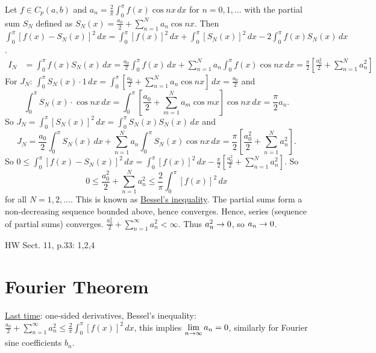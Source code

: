\documentclass[]{article}
\begin{document}
Let $f\in C_p(a,b)$ and $a_n=\frac{2}{\pi} \int_0^\pi f(x) \cos{nx} \, dx$ for $n=0,1,\dots$ with the partial sum $S_N$ defined as $S_N(x) = \frac{a_0}{2} + \sum_{n=1}^N a_n \cos{nx}$.
Then $\int_0^\pi \left[ f(x) - S_N(x) \right]^2 \, dx = \int_0^\pi \left[ f(x) \right]^2 \, dx + \int_0^\pi \left[ S_N(x) \right]^2 \, dx - 2\int_0^\pi f(x) S_N(x) \, dx$.
\begin{align*}I_N &= \int_0^\pi f(x) S_N(x) \, dx = \frac{a_0}{2} \int_0^\pi f(x) \, dx + \sum_{n=1}^N a_n \int_0^\pi f(x) \cos{nx} \, dx = \frac{\pi}{2} \left[ \frac{a_0^2}{2} + \sum_{n=1}^N a_n^2 \right] \end{align*}
For $J_N$: $\int_0^\pi S_N(x)\cdot1\,dx = \int_0^\pi \left[ \frac{a_0}{2} + \sum_{n=1}^N a_n \cos{nx} \right] \, dx = \frac{a_0}{2}$
and $$\int_0^\pi S_N(x) \cdot \cos{nx} \, dx = \int_0^\pi \left[ \frac{a_0}{2} + \sum_{m=1}^N a_m \cos{mx} \right] \cos{nx} \, dx = \frac{\pi}{2} a_n.$$
So $J_N = \int_0^\pi \left[ S_N(x) \right]^2 \, dx = \int_0^\pi S_N(x) S_N(x) \, dx $ and $$J_N = \frac{a_0}{2} \int_0^\pi S_N(x)\, dx + \sum_{n=1}^N a_n \int_0^\pi S_N(x) \cos{nx} \, dx = \frac{\pi}{2} \left[ \frac{a_0^2}{2} + \sum_{n=1}^N a_n^2 \right].$$
So $0\leq \int_0^\pi \left[ f(x) - S_N(x) \right]^2 \, dx = \int_0^\pi [f(x)]^2\, dx - \frac{\pi}{2} \left[ \frac{a_0^2}{2} + \sum_{n=1}^N a_n^2 \right]$.
So \begin{equation}0\leq \frac{a_0^2}{2} + \sum_{n=1}^N a_n^2 \leq \frac{2}{\pi} \int_0^\pi [f(x)]^2 \, dx\end{equation} for all $N=1,2,\dots$. This is known as \underline{Bessel's inequality}. The partial sums form a non-decreasing sequence bounded above, hence converges. Hence, series (sequence of partial sums) converges.
$\frac{a_0^2}{2} + \sum_{n=1}^\infty a_n^2 <\infty$. Thus $a_n^2\rightarrow 0$, so $a_n\rightarrow0$.

HW Sect. 11, p.33: 1,2,4

\section{Fourier Theorem}

\underline{Last time}: one-sided derivatives, Bessel's inequality: $ \displaystyle \frac{a_0}{2} + \sum_{n=1}^\infty a_n^2 \leq \frac{2}{\pi} \int_0^\pi [f(x)]^2 \, dx$, this implies $\displaystyle \lim_{n\rightarrow\infty} a_n =0$, similarly for Fourier sine coefficients $b_n$.
\end{document}
